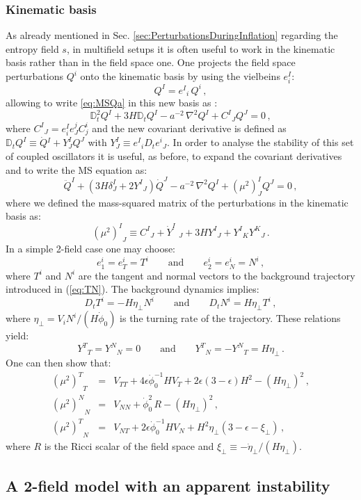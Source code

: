\documentclass[a4paper,11pt]{article}
\def\be{\begin{equation}}
\def\ee{\end{equation}}
\def\bea{\begin{eqnarray}}
\def\eea{\end{eqnarray}}
\begin{document}
\subsubsection*{Kinematic basis}

As already mentioned in Sec. \ref{sec:PerturbationsDuringInflation} regarding the entropy field $s$, in multifield setups it is often useful to work in the kinematic basis rather than in the field space one. One projects the field space perturbations $Q^i$ onto the kinematic basis by using the vielbeins $e^I_i$:
\be
Q^I={e^I}_i \,Q^i\,,
\label{eq:QI}
\ee
allowing to write \eqref{eq:MSQa} in this new basis as \cite{Achucarro:2010da}:
\be
\mathbb{D}_t^2 Q^I +3H \mathbb{D}_t Q^I-a^{-2}\,\nabla^2 Q^I+{C^I}_J Q^J=0\,,
\label{eq:pertkin}
\ee
where ${C^I}_J =e^I_i e^j_J C^i_j$ and the new covariant derivative is defined as $\mathbb{D}_t Q^I\equiv \dot{Q}{^I}+Y^I_J Q^J$ with $Y^I_J\equiv{e^I}_i D_t{e^i}_J $. In order to analyse the stability of this set of coupled oscillators it is useful, as before, to expand the covariant derivatives and to write the MS equation as:
\be
\ddot{Q}^I+(3 H \delta^I_J+2 {Y^I}_J)\dot{Q}^J-a^{-2}\,\nabla^2Q^I+(\mu^2)^I_J Q^J=0\,,
\label{MSeq}
\ee
where we defined the mass-squared matrix of the perturbations in the kinematic basis as:
\be
{\left(\mu^2\right )^I}_J\equiv {C^I}_J+{{\dot{Y}}^I }_{\:\: J}+3H {Y^I}_J+{Y^I}_K{Y^K}_J\,.
\ee
In a simple 2-field case one may choose: 
\be
e^i_1=e_T^i=T^i \qquad\text{and}\qquad e^i_2=e_N^i=N^i\,,
\ee
where $T^i$ and $N^i$ are the tangent and normal vectors to the background trajectory introduced in (\ref{eq:TN}). The background dynamics implies:
\be
D_t T^i=-H \eta_\perp N^i \qquad\text{and}\qquad D_t N^i=H \eta_\perp T^i\,,
\ee
where $\eta_\perp = V_i N^i/(H\dot\phi_0)$ is the turning rate of the trajectory. These relations yield: 
\be
{Y^T}_T={Y^N}_N=0 \qquad \text{and} \qquad {Y^T}_N=-{Y^N}_T= H \eta_\perp\,.
\ee
One can then show that: 
\bea
{\left(\mu^2\right )^T}_T&=&V_{TT}+4\epsilon \dot\phi_0^{-1} H V_T+2 \epsilon(3-\epsilon) H^2-(H \eta_\perp)^2\,, \label{first} \\
{\left(\mu^2\right )^N}_N&=&V_{NN}+\dot\phi_0^2\, R-(H \eta_\perp)^2\,, \label{muNN} \\
{\left(\mu^2\right )^T}_N&=&V_{NT}+ 2\epsilon \dot\phi_0^{-1} H V_N+H^2\eta_\perp (3-\epsilon -\xi_\perp)\,,
\label{Asympt}
\eea
where $R$ is the Ricci scalar of the field space and $\xi_\perp \equiv -\dot\eta_\perp/(H \eta_\perp)$.

\subsection{A 2-field model with an apparent instability}
\label{2fieldModel}
\end{document}
